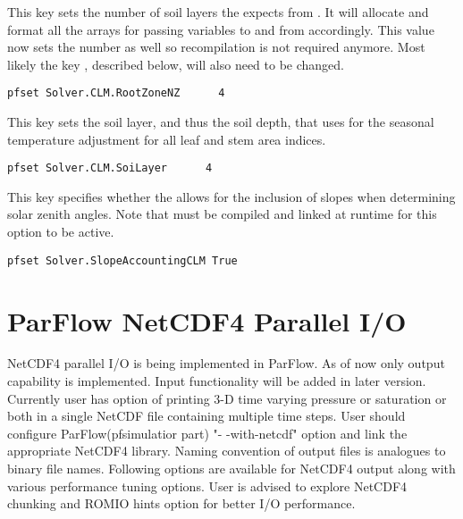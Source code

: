 {This key sets the number of soil layers the \parflow{} expects from
  .  It will allocate and format all the arrays for passing
  variables to and from  accordingly.  This value now sets
  the  number as well so recompilation is not required anymore.
  Most likely the key , described
  below, will also need to be changed.}
\begin{display}\begin{verbatim}
pfset Solver.CLM.RootZoneNZ      4
\end{verbatim}\end{display}

{This key sets the soil layer, and thus the soil depth, that  uses for the seasonal temperature adjustment for all leaf and stem area indices.}
\begin{display}\begin{verbatim}
pfset Solver.CLM.SoiLayer      4
\end{verbatim}\end{display}
{This key specifies whether the  allows for the inclusion of slopes when determining solar zenith angles.
 Note that  must be compiled and linked at runtime for this option to be active.
}
\begin{display}\begin{verbatim}
pfset Solver.SlopeAccountingCLM True
\end{verbatim}\end{display}

\section{ParFlow NetCDF4 Parallel I/O}
\label{ParFlow NetCDF4 Parallel I/O}
NetCDF4 parallel I/O is being implemented in ParFlow. As of now only output capability is implemented. Input functionality will be added in later version. Currently user has option of printing 3-D time varying pressure or saturation or both in a single NetCDF file containing multiple time steps. User should configure ParFlow(pfsimulatior part) "- -with-netcdf" option and link the appropriate NetCDF4 library.
Naming convention of output files is analogues to binary file names. Following options are available for NetCDF4 output along with various performance tuning options. User is advised to explore NetCDF4 chunking and ROMIO hints option for better I/O performance.

